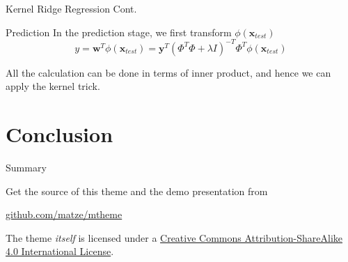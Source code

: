 \documentclass[10pt, compress]{beamer}
\begin{document}
\begin{frame}[fragile]{Kernel Ridge Regression Cont.}
  \begin{block}{Prediction}
    In the prediction stage, we first transform \( \phi(\mathbf{x}_{test}) \)
    \[
      y = \mathbf{w}^T \phi(\mathbf{x}_{test}) = \mathbf{y}^T {(\Phi^T \Phi + \lambda I)}^{-T} {\Phi}^T \phi(\mathbf{x}_{test})
    \]

    All the calculation can be done in terms of inner product, and hence we can apply the kernel trick.
  \end{block}
\end{frame}

\section{Conclusion}

\begin{frame}{Summary}

  Get the source of this theme and the demo presentation from

  \begin{center}\url{github.com/matze/mtheme}\end{center}

  The theme \emph{itself} is licensed under a
  \href{http://creativecommons.org/licenses/by-sa/4.0/}{Creative Commons
  Attribution-ShareAlike 4.0 International License}.

  \begin{center}\ccbysa\end{center}

\end{frame}

\end{document}
